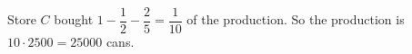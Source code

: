 Store $C$ bought $1-\dfrac12-\dfrac25=\dfrac1{10}$ of the production. So the production is $10\cdot2500=\boxed{25000}$ cans.
